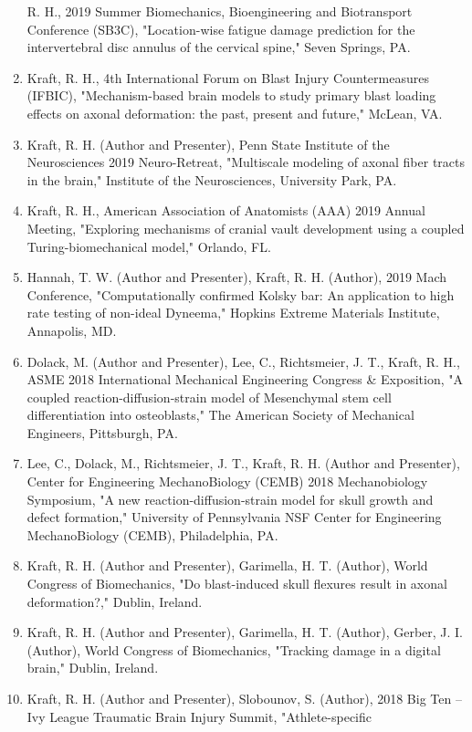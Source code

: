 \documentclass[
]{article}
\begin{document}
\begin{enumerate}
  R. H., 2019 Summer Biomechanics, Bioengineering and Biotransport
  Conference (SB3C), "Location-wise fatigue damage prediction for the
  intervertebral disc annulus of the cervical spine," Seven Springs, PA.
\item
  Kraft, R. H., 4th International Forum on Blast Injury Countermeasures
  (IFBIC), "Mechanism-based brain models to study primary blast loading
  effects on axonal deformation: the past, present and future," McLean,
  VA.
\item
  Kraft, R. H. (Author and Presenter), Penn State Institute of the
  Neurosciences 2019 Neuro-Retreat, "Multiscale modeling of axonal fiber
  tracts in the brain," Institute of the Neurosciences, University Park,
  PA.
\item
  Kraft, R. H., American Association of Anatomists (AAA) 2019 Annual
  Meeting, "Exploring mechanisms of cranial vault development using a
  coupled Turing-biomechanical model," Orlando, FL.
\item
  Hannah, T. W. (Author and Presenter), Kraft, R. H. (Author), 2019 Mach
  Conference, "Computationally confirmed Kolsky bar: An application to
  high rate testing of non-ideal Dyneema," Hopkins Extreme Materials
  Institute, Annapolis, MD.
\item
  Dolack, M. (Author and Presenter), Lee, C., Richtsmeier, J. T., Kraft,
  R. H., ASME 2018 International Mechanical Engineering Congress \&
  Exposition, "A coupled reaction-diffusion-strain model of Mesenchymal
  stem cell differentiation into osteoblasts," The American Society of
  Mechanical Engineers, Pittsburgh, PA.
\item
  Lee, C., Dolack, M., Richtsmeier, J. T., Kraft, R. H. (Author and
  Presenter), Center for Engineering MechanoBiology (CEMB) 2018
  Mechanobiology Symposium, "A new reaction-diffusion-strain model for
  skull growth and defect formation," University of Pennsylvania NSF
  Center for Engineering MechanoBiology (CEMB), Philadelphia, PA.
\item
  Kraft, R. H. (Author and Presenter), Garimella, H. T. (Author), World
  Congress of Biomechanics, "Do blast-induced skull flexures result in
  axonal deformation?," Dublin, Ireland.
\item
  Kraft, R. H. (Author and Presenter), Garimella, H. T. (Author),
  Gerber, J. I. (Author), World Congress of Biomechanics, "Tracking
  damage in a digital brain," Dublin, Ireland.
\item
  Kraft, R. H. (Author and Presenter), Slobounov, S. (Author), 2018 Big
  Ten -- Ivy League Traumatic Brain Injury Summit, "Athlete-specific

\end{enumerate}
\end{document}

